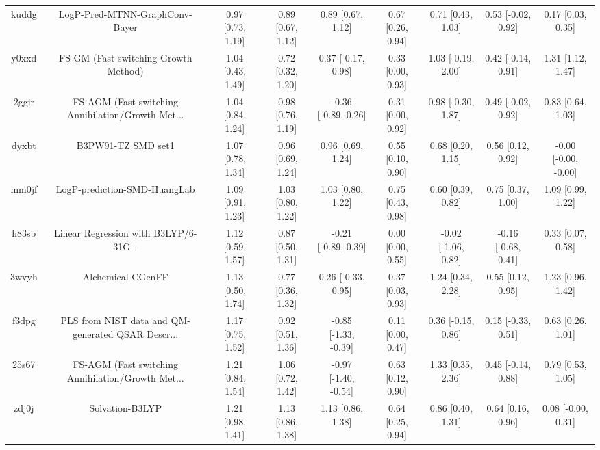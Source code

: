\documentclass{article}
\begin{document}
\begin{center}
\begin{longtable}{|ccccccccc|}
 kuddg &                     LogP-Pred-MTNN-GraphConv-Bayer &  0.97 [0.73, 1.19] &  0.89 [0.67, 1.12] &     0.89 [0.67, 1.12] &  0.67 [0.26, 0.94] &    0.71 [0.43, 1.03] &   0.53 [-0.02, 0.92] &     0.17 [0.03, 0.35] \\
 y0xxd &               FS-GM (Fast switching Growth Method) &  1.04 [0.43, 1.49] &  0.72 [0.32, 1.20] &    0.37 [-0.17, 0.98] &  0.33 [0.00, 0.93] &   1.03 [-0.19, 2.00] &   0.42 [-0.14, 0.91] &     1.31 [1.12, 1.47] \\
 2ggir &  FS-AGM (Fast switching Annihilation/Growth Met... &  1.04 [0.84, 1.24] &  0.98 [0.76, 1.19] &   -0.36 [-0.89, 0.26] &  0.31 [0.00, 0.92] &   0.98 [-0.30, 1.87] &   0.49 [-0.02, 0.92] &     0.83 [0.64, 1.03] \\
 dyxbt &                                 B3PW91-TZ SMD set1 &  1.07 [0.78, 1.34] &  0.96 [0.69, 1.24] &     0.96 [0.69, 1.24] &  0.55 [0.10, 0.90] &    0.68 [0.20, 1.15] &    0.56 [0.12, 0.92] &  -0.00 [-0.00, -0.00] \\
 mm0jf &                       LogP-prediction-SMD-HuangLab &  1.09 [0.91, 1.23] &  1.03 [0.80, 1.22] &     1.03 [0.80, 1.22] &  0.75 [0.43, 0.98] &    0.60 [0.39, 0.82] &    0.75 [0.37, 1.00] &     1.09 [0.99, 1.22] \\
 h83sb &                Linear Regression with B3LYP/6-31G+ &  1.12 [0.59, 1.57] &  0.87 [0.50, 1.31] &   -0.21 [-0.89, 0.39] &  0.00 [0.00, 0.55] &  -0.02 [-1.06, 0.82] &  -0.16 [-0.68, 0.41] &     0.33 [0.07, 0.58] \\
 3wvyh &                                  Alchemical-CGenFF &  1.13 [0.50, 1.74] &  0.77 [0.36, 1.32] &    0.26 [-0.33, 0.95] &  0.37 [0.03, 0.93] &    1.24 [0.34, 2.28] &    0.55 [0.12, 0.95] &     1.23 [0.96, 1.42] \\
 f3dpg &  PLS from NIST data and QM-generated QSAR Descr... &  1.17 [0.75, 1.52] &  0.92 [0.51, 1.36] &  -0.85 [-1.33, -0.39] &  0.11 [0.00, 0.47] &   0.36 [-0.15, 0.86] &   0.15 [-0.33, 0.51] &     0.63 [0.26, 1.01] \\
 25s67 &  FS-AGM (Fast switching Annihilation/Growth Met... &  1.21 [0.84, 1.54] &  1.06 [0.72, 1.42] &  -0.97 [-1.40, -0.54] &  0.63 [0.12, 0.90] &    1.33 [0.35, 2.36] &   0.45 [-0.14, 0.88] &     0.79 [0.53, 1.05] \\
 zdj0j &                                    Solvation-B3LYP &  1.21 [0.98, 1.41] &  1.13 [0.86, 1.38] &     1.13 [0.86, 1.38] &  0.64 [0.25, 0.94] &    0.86 [0.40, 1.31] &    0.64 [0.16, 0.96] &    0.08 [-0.00, 0.31] \\

\end{longtable}
\end{center}
\end{document}
